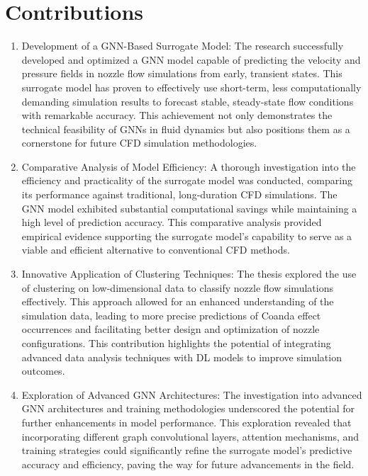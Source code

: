 \section{Contributions}
\begin{enumerate}
\item Development of a GNN-Based Surrogate Model: The research successfully developed and optimized a GNN model capable of predicting the velocity and pressure fields in nozzle flow simulations from early, transient states. This surrogate model has proven to effectively use short-term, less computationally demanding simulation results to forecast stable, steady-state flow conditions with remarkable accuracy. This achievement not only demonstrates the technical feasibility of GNNs in fluid dynamics but also positions them as a cornerstone for future CFD simulation methodologies.

\item Comparative Analysis of Model Efficiency: A thorough investigation into the efficiency and practicality of the surrogate model was conducted, comparing its performance against traditional, long-duration CFD simulations. The GNN model exhibited substantial computational savings while maintaining a high level of prediction accuracy. This comparative analysis provided empirical evidence supporting the surrogate model's capability to serve as a viable and efficient alternative to conventional CFD methods.

\item Innovative Application of Clustering Techniques: The thesis explored the use of clustering on low-dimensional data to classify nozzle flow simulations effectively. This approach allowed for an enhanced understanding of the simulation data, leading to more precise predictions of Coanda effect occurrences and facilitating better design and optimization of nozzle configurations. This contribution highlights the potential of integrating advanced data analysis techniques with DL models to improve simulation outcomes.

\item Exploration of Advanced GNN Architectures: The investigation into advanced GNN architectures and training methodologies underscored the potential for further enhancements in model performance. This exploration revealed that incorporating different graph convolutional layers, attention mechanisms, and training strategies could significantly refine the surrogate model's predictive accuracy and efficiency, paving the way for future advancements in the field.

\end{enumerate}


